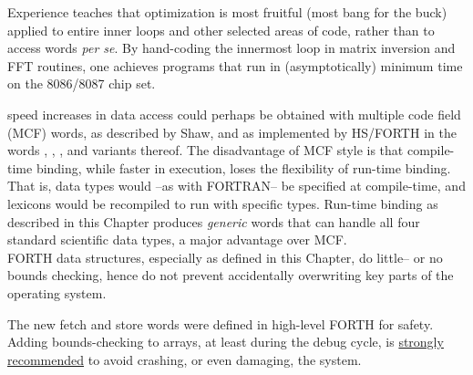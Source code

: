 Experience teaches that optimization is most fruitful (most bang for the buck) applied to entire inner loops and other selected areas of code, rather than to access words \textit{per se}. By hand-coding the innermost loop in matrix inversion and FFT routines, one achieves programs that run in (asymptotically) minimum time on the 8086/8087 chip set.

 speed increases in data access could perhaps be obtained with multiple code field (MCF) words, as described by Shaw, and as implemented by HS/FORTH in the words , , , and variants thereof. The disadvantage of MCF style is that compile-time binding, while faster in execution, loses the flexibility of run-time binding. That is, data types would --as with FORTRAN-- be specified at compile-time, and lexicons would be recompiled to run with specific types. Run-time binding as described in this Chapter produces \textit{generic} words that can handle all four standard scientific data types, a major advantage over MCF.
\\
\leftbar[1\linewidth]
FORTH data structures, especially as defined in this Chapter, do little-- or no bounds checking, hence do not prevent accidentally overwriting key parts of the operating system.

The new fetch and store words were defined in high-level FORTH for safety. Adding bounds-checking to arrays, at least during the debug cycle, is \underline{strongly recommended} to avoid crashing, or even damaging, the system.
\endleftbar